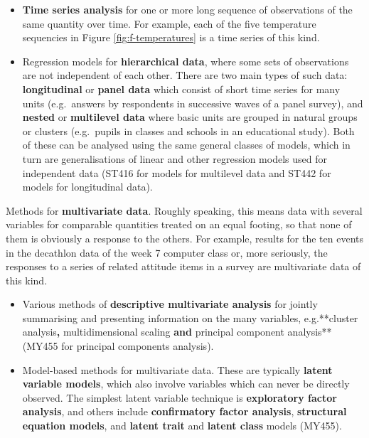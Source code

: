 \documentclass[11pt,a4paper,openany]{book}
\begin{document}
\begin{itemize}
\item
  \textbf{Time series analysis} for one or more long sequence of
  observations of the same quantity over time. For example, each of the
  five temperature sequencies in Figure \ref{fig:f-temperatures} is a
  time series of this kind.
\item
  Regression models for \textbf{hierarchical data}, where some sets of
  observations are not independent of each other. There are two main
  types of such data: \textbf{longitudinal} or \textbf{panel data} which
  consist of short time series for many units (e.g.~answers by
  respondents in successive waves of a panel survey), and
  \textbf{nested} or \textbf{multilevel data} where basic units are
  grouped in natural groups or clusters (e.g.~pupils in classes and
  schools in an educational study). Both of these can be analysed using
  the same general classes of models, which in turn are generalisations
  of linear and other regression models used for independent data (ST416
  for models for multilevel data and ST442 for models for longitudinal
  data).
\end{itemize}

Methods for \textbf{multivariate data}. Roughly speaking, this means
data with several variables for comparable quantities treated on an
equal footing, so that none of them is obviously a response to the
others. For example, results for the ten events in the decathlon data of
the week 7 computer class or, more seriously, the responses to a series
of related attitude items in a survey are multivariate data of this
kind.

\begin{itemize}
\item
  Various methods of \textbf{descriptive multivariate analysis} for
  jointly summarising and presenting information on the many variables,
  e.g.**cluster analysis\textbf{, }multidimensional scaling\textbf{ and
  }principal component analysis** (MY455 for principal components
  analysis).
\item
  Model-based methods for multivariate data. These are typically
  \textbf{latent variable models}, which also involve variables which
  can never be directly observed. The simplest latent variable technique
  is \textbf{exploratory factor analysis}, and others include
  \textbf{confirmatory factor analysis}, \textbf{structural equation
  models}, and \textbf{latent trait} and \textbf{latent class} models
  (MY455).
\end{itemize}
\end{document}
